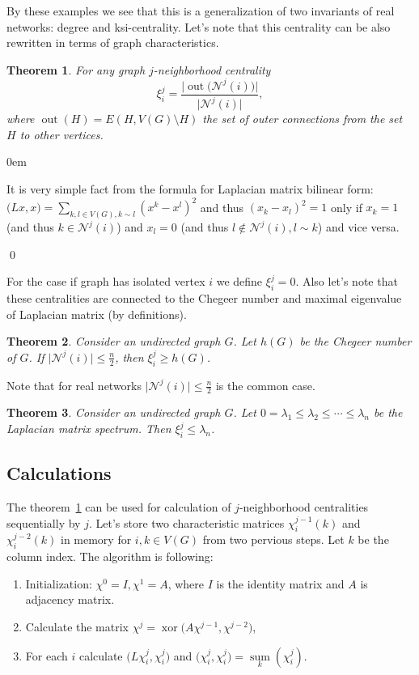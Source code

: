 \documentclass[12pt, a4paper]{extarticle}
\def \sumt {\sum\limits}
\renewenvironment{proof}{\begin{addmargin}[1em]{0em}\begin{newproof}}{\end{newproof}\end{addmargin}\qed}
\newtheorem{thm}{Theorem}
\def \sumt {\sum\limits}
\DeclareMathOperator{\out}{out}
\DeclareMathOperator{\xor}{xor}
\DeclareMathOperator{\prsum}{sum}
\def \cN {\mathcal{N}}
\def \l {\lambda}
\begin{document}
By these examples we see that this is a generalization of two invariants of real networks: degree and ksi-centrality. Let's note that this centrality can be also rewritten in terms of graph characteristics.

\begin{thm}\label{thm1}
    For any graph $j$-neighborhood centrality
    $$
        \xi^j_i = \frac {\big|\out\big(\cN^j(i)\big)\Big|} {\big|\cN^j(i)\big|},
    $$
    where $\out(H) = E(H, V(G)\setminus H)$ the set of outer connections from the set $H$ to other vertices.
\end{thm}
\begin{proof}
    It is very simple fact from the formula for Laplacian matrix bilinear form: $\big(L x, x\big) = \sumt_{k,l\in V(G), k\sim l}(x^k-x^l)^2$ and thus $(x_k-x_l)^2 = 1$ only if $x_k = 1$ (and thus $k\in \cN^j(i)$) and $x_l = 0$ (and thus $l\notin \cN^j(i), l\sim k$) and vice versa.
\end{proof}

For the case if graph has isolated vertex $i$ we define $\xi^j_i = 0$. Also let's note that these centralities are connected to the Chegeer number and  maximal eigenvalue of Laplacian matrix (by definitions).

\begin{thm}\label{st1}  Consider an undirected graph $G$. Let $h(G)$ be the Chegeer number of $G$. If $\big|\cN^j(i)\big|\leq\frac n 2$, then $\xi^j_i\geq h(G)$.
\end{thm}

Note that for real networks $\big|\cN^j(i)\big|\leq\frac n 2$ is the common case.

\begin{thm}\label{st1}  Consider an undirected graph $G$. Let $0=\l_1\leq\l_2\leq\cdots\leq\l_{n}$ be the Laplacian matrix spectrum. Then $\xi^j_i\leq\l_n$.
\end{thm}

\subsection{Calculations}

The theorem~\ref{thm1} can be used for calculation of $j$-neighborhood centralities sequentially by $j$. Let's store two characteristic matrices $\chi^{j-1}_i(k)$ and $\chi^{j-2}_i(k)$ in memory for $i, k\in V(G)$ from two pervious steps. Let $k$ be the column index. The algorithm is following:
\begin{enumerate}
    \item Initialization: $\chi^{0} = I, \chi^{1} = A$, where $I$ is the identity matrix and $A$ is adjacency matrix.
    \item Calculate the matrix $\chi^{j} = \xor\big(A \chi^{j-1}, \chi^{j-2}\big)$,
    \item For each $i$ calculate $\Big(L\chi^j_i, \chi^j_i\Big)$ and $\big(\chi^j_i, \chi^j_i\big) = \underset{k}{\prsum}(\chi^j_i)$.
\end{enumerate}
\end{document}
